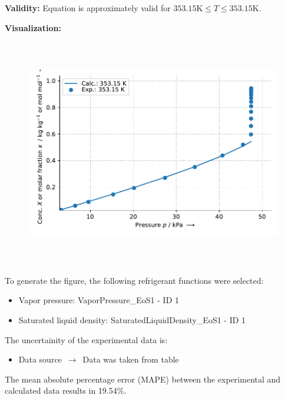 \textbf{Validity:}
\newline
Equation is approximately valid for $353.15 \si{\kelvin} \leq T \leq 353.15 \si{\kelvin}$.
\newline

\textbf{Visualization:}
%
\begin{figure}[!htp]
{\noindent\includegraphics[height=10cm, keepaspectratio]{figs/abs/abs_Water_ionic_liquid_[EMIM]+[(CF3SO2)2N]-_UniquacFixedDu_1.pdf}}
\end{figure}
%

To generate the figure, the following refrigerant functions were selected:
\begin{itemize}
\item Vapor pressure: VaporPressure\_EoS1 - ID 1
\item Saturated liquid density: SaturatedLiquidDensity\_EoS1 - ID 1
\end{itemize}

The uncertainity of the experimental data is:
\begin{itemize}
\item Data source $\,\to\,$ Data was taken from table
\end{itemize}

The mean absolute percentage error (MAPE) between the experimental and calculated data results in 19.54\%.
\FloatBarrier
\newpage
